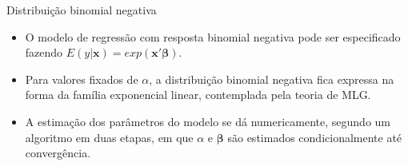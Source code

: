 \documentclass[10pt, aspectratio=169]{beamer}
\begin{document}


\begin{frame}{Distribuição binomial negativa} 

\begin{itemize}

\item O modelo de regressão com resposta binomial negativa pode ser especificado fazendo $E(y|\boldsymbol{x})=exp(\boldsymbol{x'\beta}).$

\vspace{0.5cm}

\item Para valores fixados de $\alpha$, a distribuição binomial negativa fica expressa na forma da família exponencial linear, contemplada pela teoria de MLG.

\vspace{0.5cm}

\item A estimação dos parâmetros do modelo se dá numericamente, segundo um algoritmo em duas etapas, em que $\alpha$ e $\boldsymbol{\beta}$ são estimados condicionalmente até convergência.

\end{itemize}

\end{frame}
\end{document}
